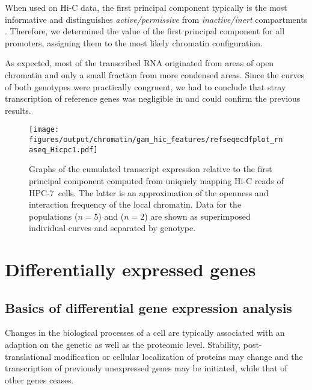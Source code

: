 When used on Hi-C data, the first principal component typically is the most informative and distinguishes \emph{active/permissive} from \emph{inactive/inert} compartments \cite{Lieberman-Aiden2009}. Therefore, we determined the value of the first principal component for all promoters, assigning them to the most likely chromatin configuration.

As expected, most of the transcribed RNA originated from areas of open chromatin and only a small fraction from more condensed areas. Since the curves of both genotypes were practically congruent, we had to conclude that stray transcription of reference genes was negligible in \dnmtchip and could confirm the previous results. 

\begin{figure}[!ht]
	\centering
	\texttt{[image: figures/output/chromatin/gam\_hic\_features/refseqecdfplot\_rnaseq\_Hicpc1.pdf]} 
	\caption{Graphs of the cumulated transcript expression relative to the first principal component computed from uniquely mapping Hi-C reads of HPC-7~cells. The latter is an approximation of the openness and interaction frequency of the local chromatin. Data for the populations \kithi ($n\!= \!5$) and \kitlow ($n\!= \!2$) are shown as superimposed individual curves and separated by genotype.}
	\label{fig:refseqecdfplot_rnaseq_Hicpc1}
\end{figure}

\chapter{Differentially expressed genes}
\label{chap:r:degenes}

\section{Basics of differential gene expression analysis}
\label{chap:r:degenes:basics}

Changes in the biological processes of a cell are typically associated with an adaption on the genetic as well as the proteomic level. Stability, post-translational modification or cellular localization of proteins may change and the transcription of previously unexpressed genes may be initiated, while that of other genes ceases. 

